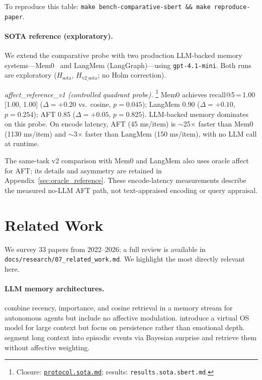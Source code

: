 \documentclass[11pt]{article}
\newcommand{\repourl}{https://github.com/gianlucamazza/emotional-memory}%
\begin{document}
To reproduce this table: \texttt{make bench-comparative-sbert \&\& make reproduce-paper}.

\paragraph{SOTA reference (exploratory).}
We extend the comparative probe with two production LLM-backed memory
systems---Mem0~\citep{chhikara2025mem0} and LangMem (LangGraph)---using
\texttt{gpt-4.1-mini}.  Both runs are exploratory ($H_{\text{sota}}$,
$H_{\text{v2\_sota}}$; no Holm correction).

\textit{affect\_reference\_v1 (controlled quadrant probe).}%
\footnote{Closure: \href{\repourl/blob/main/benchmarks/comparative/protocol.sota.md}%
{\texttt{protocol.sota.md}}; results: \texttt{results.sota.sbert.md}.}
Mem0 achieves recall@5\,=\,1.00 [1.00, 1.00]
($\Delta=+0.20$ vs.\ cosine, $p=0.045$); LangMem 0.90 ($\Delta=+0.10$, $p=0.254$);
AFT 0.85 ($\Delta=+0.05$, $p=0.825$).
LLM-backed memory dominates on this probe.
On encode latency, AFT (45 ms/item) is $\sim$25$\times$ faster than
Mem0 (1130 ms/item) and $\sim$3$\times$ faster than LangMem (150 ms/item),
with no LLM call at runtime.

The same-task v2 comparison with Mem0 and LangMem also uses oracle affect
for AFT; its details and asymmetry are retained in
Appendix~\ref{sec:oracle_reference}. These encode-latency measurements describe
the measured no-LLM AFT path, not text-appraised encoding or query appraisal.

\section{Related Work}
\label{sec:related}

\begin{sloppypar}
We survey 33 papers from 2022--2026; a full review is available in
\texttt{docs/research/07\_related\_work.md}. We highlight the most directly
relevant here.
\end{sloppypar}

\paragraph{LLM memory architectures.}
\citet{park2023generative} combine recency, importance, and cosine retrieval
in a memory stream for autonomous agents but include no affective modulation.
\citet{packer2023memgpt} introduce a virtual OS model for large context but
focus on persistence rather than emotional depth.
\citet{fountas2024emllm} segment long context into episodic events via Bayesian
surprise and retrieve them without affective weighting.
\end{document}
